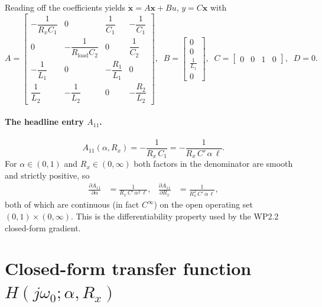 \documentclass[11pt,a4paper]{article}
\begin{document}
Reading off the coefficients yields $\mathbf{\dot x} = A\mathbf{x} + Bu$,
$y = C\mathbf{x}$ with
\begin{equation}
  A = \begin{bmatrix}
    -\dfrac{1}{R_x C_1} & 0 & \dfrac{1}{C_1} & -\dfrac{1}{C_1} \\[6pt]
     0 & -\dfrac{1}{R_{\text{load}} C_2} & 0 & \dfrac{1}{C_2} \\[6pt]
     -\dfrac{1}{L_1} & 0 & -\dfrac{R_1}{L_1} & 0 \\[6pt]
     \dfrac{1}{L_2} & -\dfrac{1}{L_2} & 0 & -\dfrac{R_2}{L_2}
  \end{bmatrix},\;\;
  B = \begin{bmatrix} 0\\ 0\\ \tfrac{1}{L_1}\\ 0 \end{bmatrix},\;\;
  C = \begin{bmatrix} 0 & 0 & 1 & 0 \end{bmatrix},\;\; D=0.
  \label{eq:ABCD}
\end{equation}

\paragraph{The headline entry $A_{11}$.}
\begin{equation}
   A_{11}(\alpha, R_x)
        = -\frac{1}{R_x\,C_1}
        = -\frac{1}{R_x\, C'\,\alpha\,\ell}.
\end{equation}
For $\alpha \in (0,1)$ and $R_x \in (0,\infty)$ both factors in the
denominator are smooth and strictly positive, so
\begin{align}
\frac{\partial A_{11}}{\partial \alpha}
    &= \frac{1}{R_x\, C'\,\alpha^2\,\ell}, &
\frac{\partial A_{11}}{\partial R_x}
    &= \frac{1}{R_x^2\, C'\,\alpha\,\ell},
\end{align}
both of which are continuous (in fact $C^\infty$) on the open
operating set $(0,1)\times(0,\infty)$.  This is the differentiability
property used by the WP2.2 closed-form gradient.

\section{Closed-form transfer function $H(j\omega_0; \alpha, R_x)$}\label{sec:H}
\end{document}
